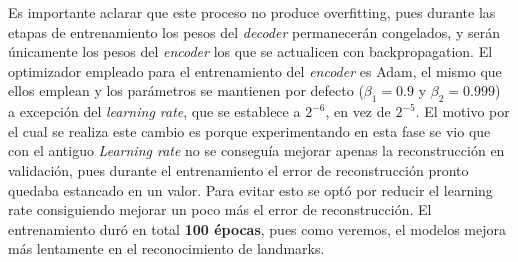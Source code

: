         \noindent Es importante aclarar que este proceso no produce overfitting, pues durante las etapas de entrenamiento los pesos del \textit{decoder} permanecerán congelados, y serán únicamente los pesos del \textit{encoder} los que se actualicen con backpropagation. El optimizador empleado para el entrenamiento del \textit{encoder} es Adam, el mismo que ellos emplean y los parámetros se mantienen por defecto ($\beta_1=0.9$ y $\beta_2=0.999$) a excepción del \textit{learning rate}, que se establece a $2^{-6}$, en vez de $2^{-5}$. El motivo por el cual se realiza este cambio es porque experimentando en esta fase se vio que con el antiguo \textit{Learning rate} no se conseguía mejorar apenas la reconstrucción en validación, pues durante el entrenamiento el error de reconstrucción pronto quedaba estancado en un valor. Para evitar esto se optó por reducir el learning rate consiguiendo mejorar un poco más el error de reconstrucción. El entrenamiento duró en total \textbf{100 épocas}, pues como veremos, el modelos mejora más lentamente en el reconocimiento de landmarks.

